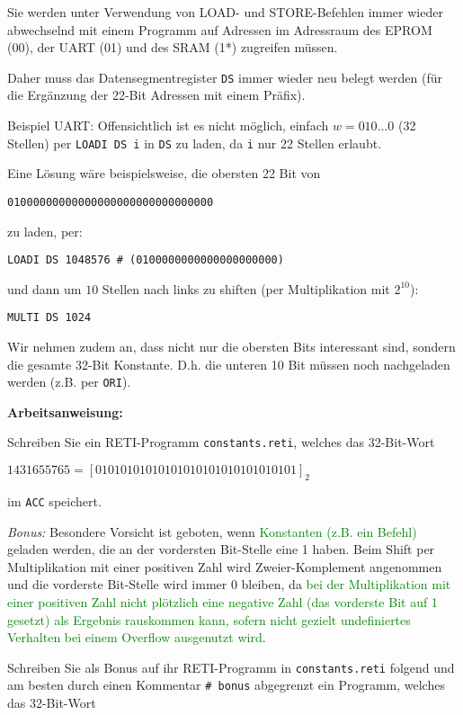 \documentclass{article}
\begin{document}
	Sie werden unter Verwendung von LOAD- und STORE-Befehlen immer wieder
	abwechselnd mit einem Programm auf Adressen im Adressraum des EPROM (00), der 
	UART (01) und des SRAM (1*)	zugreifen müssen.
	
	Daher muss das Datensegmentregister \verb_DS_ immer wieder neu belegt werden 
	(für die Ergänzung der 22-Bit Adressen mit einem Präfix). 
	
	Beispiel UART: Offensichtlich ist es nicht möglich, einfach $w = 010...0$ (32 Stellen)
	per \texttt{LOADI DS i} in \texttt{DS} zu laden, da \texttt{i} nur 22 Stellen erlaubt.

	Eine Lösung wäre beispielsweise, die obersten 22 Bit von 

	{\color{red}\verb_0100000000000000000000_}\verb_0000000000_

	zu laden, per:

  \verb_LOADI DS _{\color{red}\verb_1048576_}\verb_ # (_{\color{red}\verb_0100000000000000000000_}\verb_)_

	und dann um $10$ Stellen nach links zu shiften (per Multiplikation mit $2^{10}$):

  \verb_MULTI DS 1024_

	Wir nehmen zudem an, dass nicht nur die obersten Bits interessant sind,
	sondern die gesamte 32-Bit Konstante.
	D.h. die unteren 10 Bit müssen noch nachgeladen werden (z.B. per \texttt{ORI}).

	\textbf{Arbeitsanweisung:}

	Schreiben Sie ein RETI-Programm \texttt{constants.reti}, welches das 32-Bit-Wort 
	
	$1431655765 = [01010101010101010101010101010101]_2$

	im \texttt{ACC} speichert.

  \emph{Bonus:} Besondere Vorsicht ist geboten, wenn \textcolor{green}{Konstanten (z.B. ein Befehl)} geladen werden,
	die an der vordersten Bit-Stelle eine 1 haben. Beim Shift per Multiplikation mit einer positiven Zahl wird 
	Zweier-Komplement angenommen und die vorderste Bit-Stelle wird immer 0 bleiben,
  da \textcolor{green}{bei der Multiplikation mit einer positiven Zahl nicht plötzlich eine negative Zahl (das vorderste Bit auf 1 gesetzt) als Ergebnis rauskommen kann, sofern nicht gezielt undefiniertes Verhalten bei einem Overflow ausgenutzt wird}.

	Schreiben Sie als Bonus auf ihr RETI-Programm in \texttt{constants.reti} folgend und am besten durch einen Kommentar \verb|# bonus| abgegrenzt ein Programm, welches das 32-Bit-Wort 
	
\end{document}
